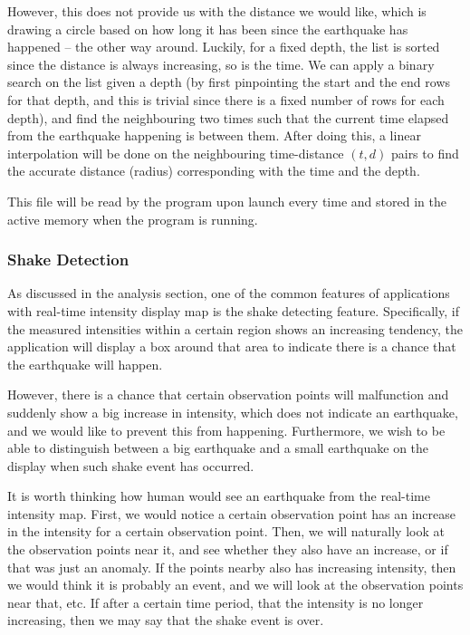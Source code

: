 However, this does not provide us with the distance we would like, which is drawing a circle based on how long it has been since the earthquake has happened -- the other way around. Luckily, for a fixed depth, the list is sorted since the distance is always increasing, so is the time. We can apply a binary search on the list given a depth (by first pinpointing the start and the end rows for that depth, and this is trivial since there is a fixed number of rows for each depth), and find the neighbouring two times such that the current time elapsed from the earthquake happening is between them. After doing this, a linear interpolation will be done on the neighbouring time-distance \((t, d)\) pairs to find the accurate distance (radius) corresponding with the time and the depth.

This file will be read by the program upon launch every time and stored in the active memory when the program is running.

\subsubsection{Shake Detection}

As discussed in the analysis section, one of the common features of applications with real-time intensity display map is the shake detecting feature. Specifically, if the measured intensities within a certain region shows an increasing tendency, the application will display a box around that area to indicate there is a chance that the earthquake will happen.

However, there is a chance that certain observation points will malfunction and suddenly show a big increase in intensity, which does not indicate an earthquake, and we would like to prevent this from happening. Furthermore, we wish to be able to distinguish between a big earthquake and a small earthquake on the display when such shake event has occurred.

It is worth thinking how human would see an earthquake from the real-time intensity map. First, we would notice a certain observation point has an increase in the intensity for a certain observation point. Then, we will naturally look at the observation points near it, and see whether they also have an increase, or if that was just an anomaly. If the points nearby also has increasing intensity, then we would think it is probably an event, and we will look at the observation points near that, etc. If after a certain time period, that the intensity is no longer increasing, then we may say that the shake event is over.

